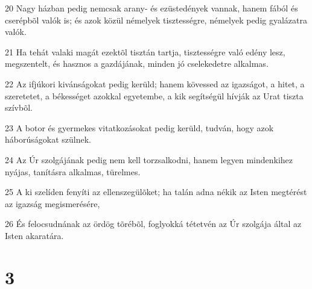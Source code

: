 \par 20 Nagy házban pedig nemcsak arany- és ezüstedények vannak, hanem fából és cserépbõl valók is; és azok közül némelyek tisztességre, némelyek pedig gyalázatra valók.
\par 21 Ha tehát valaki magát ezektõl tisztán tartja, tisztességre való edény lesz, megszentelt, és hasznos a gazdájának, minden jó cselekedetre alkalmas.
\par 22 Az ifjúkori kivánságokat pedig kerüld; hanem kövessed az igazságot, a hitet, a szeretetet, a békességet azokkal egyetembe, a kik segítségül hívják az Urat tiszta szívbõl.
\par 23 A botor és gyermekes vitatkozásokat pedig kerüld, tudván, hogy azok háborúságokat szülnek.
\par 24 Az Úr szolgájának pedig nem kell torzsalkodni, hanem legyen mindenkihez nyájas, tanításra alkalmas, türelmes.
\par 25 A ki szelíden fenyíti az ellenszegülõket; ha talán adna nékik az Isten megtérést az igazság megismerésére,
\par 26 És felocsudnának az ördög tõrébõl, foglyokká tétetvén az Úr szolgája által az Isten akaratára.

\chapter{3}

